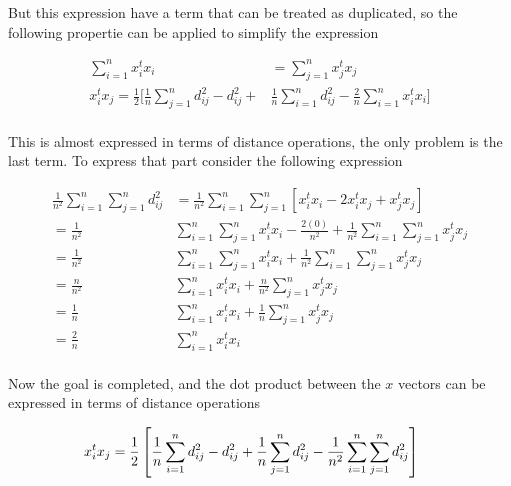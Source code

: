 \documentclass[12pt,journal]{IEEEtran}
\begin{document}
    But this expression have a term that can be treated as duplicated, so the
    following propertie can be applied to simplify the expression

    \begin{equation*}
        \begin{aligned}
            \sum_{i=1}^n x_i^t x_i &= \sum_{j=1}^n x_j^t x_j\\
            x_i^t x_j =
            \frac{1}{2} \Bigg [ \frac{1}{n} \sum_{j=1}^n d_{ij}^2 - d_{ij}^2 + &\frac{1}{n} \sum_{i=1}^n d_{ij}^2 - \frac{2}{n} \sum_{i=1}^n x_i^t x_i \Bigg ]\\
        \end{aligned}
    \end{equation*}

    This is almost expressed in terms of distance operations, the only problem
    is the last term. To express that part consider the following expression

    \begin{equation*}
        \begin{aligned}
            \frac{1}{n^2}\sum_{i=1}^n \sum_{j=1}^n d_{ij}^2
            &=
            \frac{1}{n^2}\sum_{i=1}^n \sum_{j=1}^n [x_i^t x_i - 2 x_i^t x_j + x_j^t x_j]\\
            =
            \frac{1}{n^2}&\sum_{i=1}^n \sum_{j=1}^n x_i^t x_i - \frac{2(0)}{n^2} +  \frac{1}{n^2}\sum_{i=1}^n \sum_{j=1}^nx_j^t x_j\\
            =
            \frac{1}{n^2}&\sum_{i=1}^n \sum_{j=1}^n x_i^t x_i +  \frac{1}{n^2}\sum_{i=1}^n \sum_{j=1}^nx_j^t x_j\\
            =
            \frac{n}{n^2}&\sum_{i=1}^n x_i^t x_i +  \frac{n}{n^2}\sum_{j=1}^n x_j^t x_j\\
            =
            \frac{1}{n}&\sum_{i=1}^n x_i^t x_i +  \frac{1}{n}\sum_{j=1}^n x_j^t x_j\\
            =
            \frac{2}{n}&\sum_{i=1}^n x_i^t x_i\\
        \end{aligned}
    \end{equation*}

    Now the goal is completed, and the dot product between the $x$ vectors
    can be expressed in terms of distance operations

    \begin{equation*}
        \hspace{-0.5cm}
        \begin{aligned}
            x_i^t x_j
            &=
            \frac{1}{2} \left[ \frac{1}{n} \sum_{i=1}^n d_{ij}^2 - d_{ij}^2 + \frac{1}{n} \sum_{j=1}^n d_{ij}^2 - \frac{1}{n^2}\sum_{i=1}^n \sum_{j=1}^n d_{ij}^2 \right]\\
        \end{aligned}
    \end{equation*}
\end{document}

